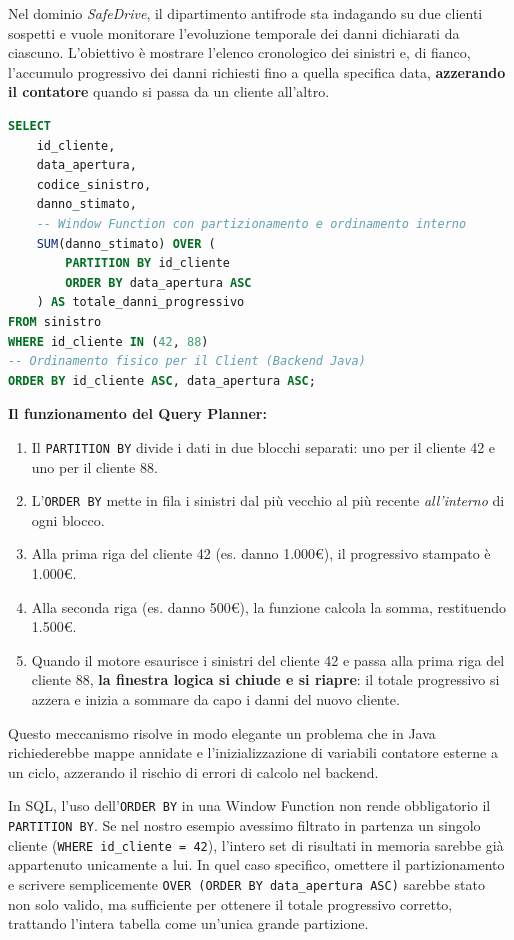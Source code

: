 \begin{example}
Nel dominio \textit{SafeDrive}, il dipartimento antifrode sta indagando su due clienti sospetti e vuole monitorare l'evoluzione temporale dei danni dichiarati da ciascuno. L'obiettivo è mostrare l'elenco cronologico dei sinistri e, di fianco, l'accumulo progressivo dei danni richiesti fino a quella specifica data, \textbf{azzerando il contatore} quando si passa da un cliente all'altro.

\begin{lstlisting}[language=SQL, basicstyle=\ttfamily\small, keywordstyle=\color{blue}\bfseries]
SELECT 
    id_cliente,
    data_apertura,
    codice_sinistro,
    danno_stimato,
    -- Window Function con partizionamento e ordinamento interno
    SUM(danno_stimato) OVER (
        PARTITION BY id_cliente 
        ORDER BY data_apertura ASC
    ) AS totale_danni_progressivo
FROM sinistro
WHERE id_cliente IN (42, 88)
-- Ordinamento fisico per il Client (Backend Java)
ORDER BY id_cliente ASC, data_apertura ASC;
\end{lstlisting}

\textbf{Il funzionamento del Query Planner:}
\begin{enumerate}
    \item Il \texttt{PARTITION BY} divide i dati in due blocchi separati: uno per il cliente 42 e uno per il cliente 88.
    \item L'\texttt{ORDER BY} mette in fila i sinistri dal più vecchio al più recente \textit{all'interno} di ogni blocco.
    \item Alla prima riga del cliente 42 (es. danno 1.000€), il progressivo stampato è 1.000€.
    \item Alla seconda riga (es. danno 500€), la funzione calcola la somma, restituendo 1.500€.
    \item Quando il motore esaurisce i sinistri del cliente 42 e passa alla prima riga del cliente 88, \textbf{la finestra logica si chiude e si riapre}: il totale progressivo si azzera e inizia a sommare da capo i danni del nuovo cliente.
\end{enumerate}
Questo meccanismo risolve in modo elegante un problema che in Java richiederebbe mappe annidate e l'inizializzazione di variabili contatore esterne a un ciclo, azzerando il rischio di errori di calcolo nel backend.
\end{example}

\begin{observation}
In SQL, l'uso dell'\texttt{ORDER BY} in una Window Function non rende obbligatorio il \texttt{PARTITION BY}. Se nel nostro esempio avessimo filtrato in partenza un singolo cliente (\texttt{WHERE id\_cliente = 42}), l'intero set di risultati in memoria sarebbe già appartenuto unicamente a lui. In quel caso specifico, omettere il partizionamento e scrivere semplicemente \texttt{OVER (ORDER BY data\_apertura ASC)} sarebbe stato non solo valido, ma sufficiente per ottenere il totale progressivo corretto, trattando l'intera tabella come un'unica grande partizione.
\end{observation}

